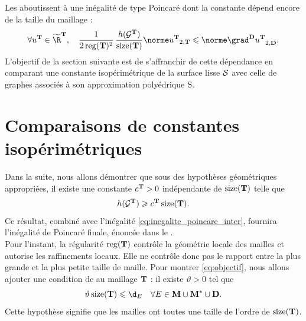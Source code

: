 \noindent Les  aboutissent à une inégalité de type Poincaré dont la constante dépend encore de la taille du maillage :
\begin{equation} \label{eq:inegalite_poincare_inter}
\forall u^\ensddfvplat \in \Rddfvmn, 
\quad
\frac{1}{2 \reg(\ensddfvplat)^2} \, \frac{h(\graphe^\ensddfvplat)}{\size(\ensddfvplat)} \normeddfvT{u^\ensddfvplat} \leqslant \normeddfvD{\grad^\ensdiamantplat u^\ensddfvplat}.
\end{equation}
L'objectif de la section suivante est de s'affranchir de cette dépendance en comparant une constante isopérimétrique de la surface lisse $\mathcal{S}$ avec celle de graphes associés à son approximation polyédrique $\mathrm{S}$.

\section{Comparaisons de constantes isopérimétriques} \label{subsec:passage_du_discret_au_continu}

Dans la suite, nous allons démontrer que sous des hypothèses géométriques appropriées, il existe une constante $c^{\mathbf{T}} > 0$ indépendante de $\operatorname{size}(\mathbf{T})$ telle que
\begin{equation} \label{eq:objectif}
h(\mathcal{G}^{\mathbf{T}}) \geqslant c^{\mathbf{T}} \operatorname{size}(\mathbf{T}).
\end{equation}
Ce résultat, combiné avec l'inégalité \ref{eq:inegalite_poincare_inter}, fournira l'inégalité de Poincaré finale, énoncée dans le . \\

Pour l'instant, la régularité $\operatorname{reg}(\mathbf{T})$ contrôle la géométrie locale des mailles et autorise les raffinements locaux. Elle ne contrôle donc pas le rapport entre la plus grande et la plus petite taille de maille. Pour montrer \ref{eq:objectif}, nous allons ajouter une condition de  au maillage $\mathbf{T}$ : il existe $\vartheta > 0$ tel que
\begin{equation} \label{eq:quasi_uniformite}
\vartheta \size(\ensddfvplat) \leqslant \diam{E} \quad \forall E \in \ensprimalplat \cup \ensdualplat \cup \ensdiamantplat.
\end{equation}
Cette hypothèse signifie que les mailles ont toutes une taille de l'ordre de $\operatorname{size}(\mathbf{T})$. \\

